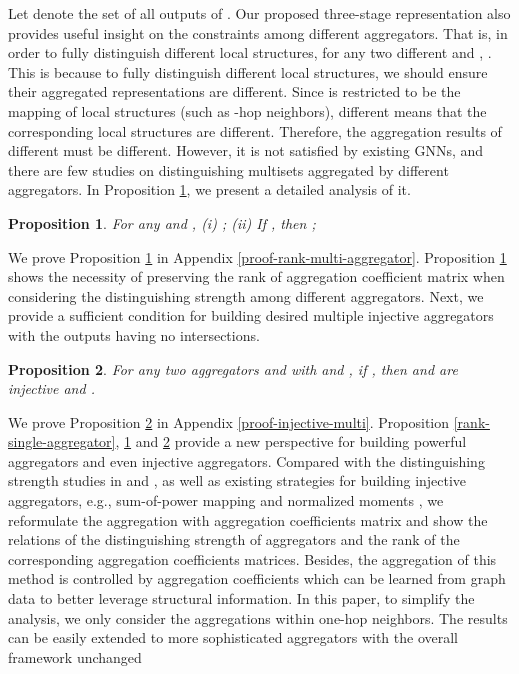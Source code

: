 \documentclass{article} \usepackage{iclr2021_conference,times}
\newtheorem{proposition}{Proposition}
\begin{document}
Let  denote the set of all outputs of .
Our proposed three-stage representation also provides useful insight on the constraints among different aggregators.
That is,
in order to fully distinguish different local structures,
for any two different  and , .
This is because to fully distinguish different local structures, we should ensure their aggregated representations are different.
Since  is restricted to be the mapping of local structures (such as -hop neighbors),
different  means that the corresponding local structures are different. Therefore, the aggregation results of different  must be different.
However, it is not satisfied by existing GNNs,
and there are few studies on distinguishing multisets aggregated by different aggregators.
In Proposition \ref{rank-multi-aggregator},
we present a detailed analysis of it.
\begin{proposition}
\label{rank-multi-aggregator}
For any  and ,
(i) ;
(ii) If ,
then ;
\end{proposition}
We prove Proposition \ref{rank-multi-aggregator} in Appendix \ref{proof-rank-multi-aggregator}.
Proposition \ref{rank-multi-aggregator} shows the necessity of preserving the rank of aggregation coefficient matrix when considering the distinguishing strength among different aggregators.
Next, we provide a sufficient condition for building desired multiple injective aggregators with the outputs having no intersections.
\begin{proposition}
\label{injective-multi}
For any two aggregators  and  with  and ,
if ,
then  and  are injective and
.
\end{proposition}
We prove Proposition \ref{injective-multi} in Appendix \ref{proof-injective-multi}.
Proposition \ref{rank-single-aggregator}, \ref{rank-multi-aggregator} and \ref{injective-multi} provide a new perspective for building powerful aggregators and even injective aggregators.
Compared with the distinguishing strength studies in \citep{xu2018how} and \citep{corso2020principal},
as well as existing strategies for building injective aggregators,
e.g., sum-of-power mapping \citep{zaheer2017deep} and normalized moments \citep{corso2020principal},
we reformulate the aggregation with aggregation coefficients matrix and show the relations of the distinguishing strength of aggregators and the rank of the corresponding aggregation coefficients matrices.
Besides, the aggregation of this method is controlled by aggregation coefficients which can be learned from graph data to better leverage structural information.
In this paper,
to simplify the analysis,
we only consider the aggregations within one-hop neighbors.
The results can be easily extended to more sophisticated aggregators with the overall framework unchanged
\end{document}
